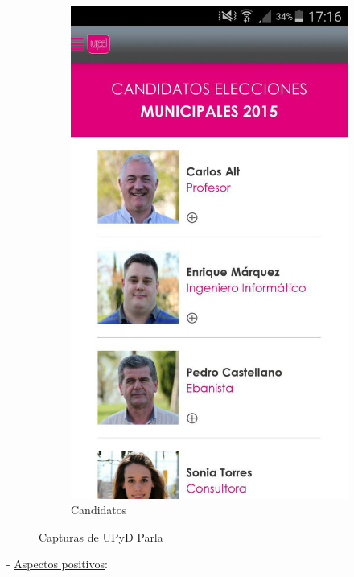 \begin{figure}[H]
\begin{subfigure}[b]{0.3\textwidth}
                \includegraphics[width=\textwidth]{Media/Captures/UPyDParlaCandidates.jpg}
                \caption{Candidatos}
                \label{fig:upydCandidates}
        \end{subfigure}
        \caption{Capturas de UPyD Parla}\label{fig:upydCaptures}
\end{figure}

 - \underline{Aspectos positivos}:

